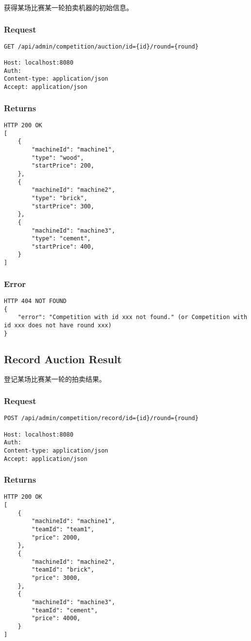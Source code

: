 \documentclass{article}
\begin{document}
获得某场比赛某一轮拍卖机器的初始信息。

\subsubsection*{Request}
\begin{lstlisting}
GET /api/admin/competition/auction/id={id}/round={round}

Host: localhost:8080
Auth:
Content-type: application/json
Accept: application/json
\end{lstlisting}

\subsubsection*{Returns}
\begin{lstlisting}
HTTP 200 OK
[
	{
		"machineId": "machine1",
		"type": "wood",
		"startPrice": 200,
	},
	{
		"machineId": "machine2",
		"type": "brick",
		"startPrice": 300,
	},
	{
		"machineId": "machine3",
		"type": "cement",
		"startPrice": 400,
	}
]
\end{lstlisting}

\subsubsection*{Error}
\begin{lstlisting}
HTTP 404 NOT FOUND
{
    "error": "Competition with id xxx not found." (or Competition with id xxx does not have round xxx)
}
\end{lstlisting}

\subsection{Record Auction Result}

登记某场比赛某一轮的拍卖结果。

\subsubsection*{Request}
\begin{lstlisting}
POST /api/admin/competition/record/id={id}/round={round}

Host: localhost:8080
Auth:
Content-type: application/json
Accept: application/json
\end{lstlisting}

\subsubsection*{Returns}
\begin{lstlisting}
HTTP 200 OK
[
	{
		"machineId": "machine1",
		"teamId": "team1",
		"price": 2000,
	},
	{
		"machineId": "machine2",
		"teamId": "brick",
		"price": 3000,
	},
	{
		"machineId": "machine3",
		"teamId": "cement",
		"price": 4000,
	}
]
\end{lstlisting}
\end{document}
